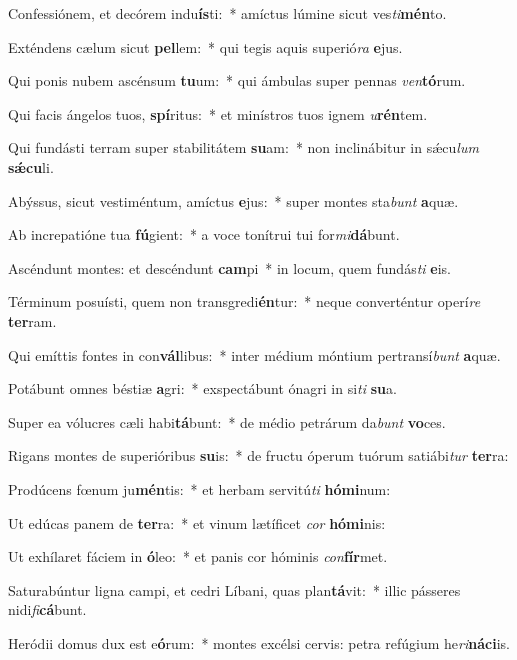 \item Confessiónem, et decórem indu\textbf{ís}ti:~* amíctus lúmine sicut ves\textit{ti}\textbf{mén}to.
\item Exténdens cælum sicut \textbf{pel}lem:~* qui tegis aquis superió\textit{ra} \textbf{e}jus.
\item Qui ponis nubem ascénsum \textbf{tu}um:~* qui ámbulas super pennas \textit{ven}\textbf{tó}rum.
\item Qui facis ángelos tuos, \textbf{spí}ritus:~* et minístros tuos ignem \textit{u}\textbf{rén}tem.
\item Qui fundásti terram super stabilitátem \textbf{su}am:~* non inclinábitur in sǽcu\textit{lum} \textbf{sǽ}\textbf{cu}li.
\item Abýssus, sicut vestiméntum, amíctus \textbf{e}jus:~* super montes sta\textit{bunt} \textbf{a}quæ.
\item Ab increpatióne tua \textbf{fú}gient:~* a voce tonítrui tui for\textit{mi}\textbf{dá}bunt.
\item Ascéndunt montes: et descéndunt \textbf{cam}pi~* in locum, quem fundás\textit{ti} \textbf{e}is.
\item Términum posuísti, quem non transgredi\textbf{én}tur:~* neque converténtur operí\textit{re} \textbf{ter}ram.
\item Qui emíttis fontes in con\textbf{vál}libus:~* inter médium móntium pertransí\textit{bunt} \textbf{a}quæ.
\item Potábunt omnes béstiæ \textbf{a}gri:~* exspectábunt ónagri in si\textit{ti} \textbf{su}a.
\item Super ea vólucres cæli habi\textbf{tá}bunt:~* de médio petrárum da\textit{bunt} \textbf{vo}ces.
\item Rigans montes de superióribus \textbf{su}is:~* de fructu óperum tuórum satiábi\textit{tur} \textbf{ter}ra:
\item Prodúcens fœnum ju\textbf{mén}tis:~* et herbam servitú\textit{ti} \textbf{hó}\textbf{mi}num:
\item Ut edúcas panem de \textbf{ter}ra:~* et vinum lætíficet \textit{cor} \textbf{hó}\textbf{mi}nis:
\item Ut exhílaret fáciem in \textbf{ó}leo:~* et panis cor hóminis \textit{con}\textbf{fír}met.
\item Saturabúntur ligna campi, et cedri Líbani, quas plan\textbf{tá}vit:~* illic pásseres nidi\textit{fi}\textbf{cá}bunt.
\item Heródii domus dux est e\textbf{ó}rum:~* montes excélsi cervis: petra refúgium he\textit{ri}\textbf{ná}\textbf{ci}is.
